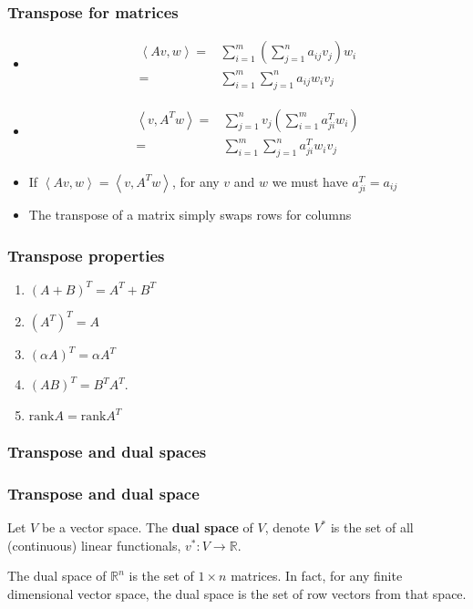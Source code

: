 \documentclass[compress]{beamer}
\def\R{\mathbb{R}}
\newcommand{\iprod}[2]{\left\langle {#1} , {#2} \right\rangle}
\newcommand{\rank}{\mathrm{rank}}
\theoremstyle{definition}
\begin{document}
\begin{frame}
  \frametitle{Transpose for matrices}
  \begin{itemize}
  \item 
    \begin{align*}
      \iprod{Av}{w} = & \sum_{i=1}^m \left(\sum_{j=1}^n a_{ij} v_j \right)
      w_i  \\
      = & \sum_{i=1}^m \sum_{j=1}^n a_{ij} w_i v_j
    \end{align*}
  \item  
    \begin{align*}
      \iprod{v}{A^T w} = & \sum_{j=1}^n v_j \left(\sum_{i=1}^m a_{ji}^T
        w_i\right) \\
      = & \sum_{i=1}^m \sum_{j=1}^n a_{ji}^T w_i v_j
    \end{align*}
  \item If $\iprod{A v}{w} = \iprod{v}{A^T w} $, for any $v$ and $w$ we must
    have $a_{ji}^T = a_{ij}$
  \item The transpose of a matrix simply swaps rows
    for columns
  \end{itemize}
\end{frame}

\begin{frame}
  \frametitle{Transpose properties}
  \begin{enumerate}
  \item $(A+B)^T = A^T + B^T$
  \item $(A^T)^T = A$
  \item $(\alpha A)^T = \alpha A^T$
  \item $(AB)^T = B^T A^T$.
  \item $\rank A = \rank A^T$
  \end{enumerate}
\end{frame}

\subsubsection{Transpose and dual spaces}

\begin{frame} \frametitle{Transpose and dual space}
  \begin{definition}
    Let $V$ be a vector space. The \textbf{dual space} of $V$, denote
    $V^\ast$ is the set of all (continuous) linear functionals,
    $v^\ast: V \to \R$.
  \end{definition}
  
  \begin{example}
    The dual space of $\R^n$ is the set of $1 \times n$ matrices. In
    fact, for any finite dimensional vector space, the dual space is the
    set of row vectors from that space.        
  \end{example}
  
\end{frame}
\end{document}
